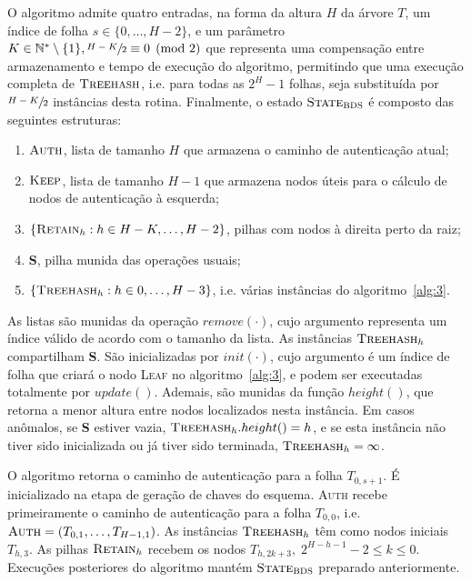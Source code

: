 \documentclass[12pt]{report}
\begin{document}
O algoritmo admite quatro entradas, na forma da altura $H$ da árvore $T$, um índice de folha $s \in \{0, \dots, H - 2\}$, e um parâmetro $K \in \mathbb{N}^{*} \setminus \{1\}, \sfrac{H - K}{2} \equiv 0 \pmod{2}$ que representa uma compensação entre armazenamento e tempo de execução do algoritmo, permitindo que uma execução completa de $\textsc{Treehash}$, i.e. para todas as $2^H - 1$ folhas, seja substituída por $\sfrac{H - K}{2}$ instâncias desta rotina. Finalmente, o estado $\textsc{State}_{\textsc{BDS}}$ é composto das seguintes estruturas: 

\begin{enumerate}[label=(\roman*)]

    \item $\textsc{Auth}$, lista de tamanho $H$ que armazena o caminho de autenticação atual;

    \item $\textsc{Keep}$, lista de tamanho $H - 1$ que armazena nodos úteis para o cálculo de nodos de autenticação à esquerda;
    
    \item $\{\textsc{Retain}_{h} : h \in H - K, \dots, H - 2\}$, pilhas com nodos à direita perto da raiz;
    
    \item \textbf{S}, pilha munida das operações usuais;
    
    \item $\{\textsc{Treehash}_{h} : h \in 0, \dots, H - 3\}$, i.e. várias instâncias do algoritmo~\ref{alg:3}.
\end{enumerate}

As listas são munidas da operação $remove(\cdot)$, cujo argumento representa um índice válido de acordo com o tamanho da lista. As instâncias $\textsc{Treehash}_{h}$ compartilham \textbf{S}. São inicializadas por $init(\cdot)$, cujo argumento é um índice de folha que criará o nodo \textsc{Leaf} no algoritmo~\ref{alg:3}, e podem ser executadas totalmente por $update()$. Ademais, são munidas da função $height()$, que retorna a menor altura entre nodos localizados nesta instância. Em casos anômalos, se \textbf{S} estiver vazia, $\textsc{Treehash}_{h}.height() = h$, e se esta instância não tiver sido inicializada ou já tiver sido terminada, $\textsc{Treehash}_{h} = \infty$.

O algoritmo retorna o caminho de autenticação para a folha $T_{0, s + 1}$. É inicializado na etapa de geração de chaves do esquema. \textsc{Auth} recebe primeiramente o caminho de autenticação para a folha $T_{0, 0}$, i.e. $\textsc{Auth} = (T_{0, 1}, \dots, T_{H -1, 1})$. As instâncias $\textsc{Treehash}_{h}$ têm como nodos iniciais $T_{h, 3}$. As pilhas $\textsc{Retain}_{h}$ recebem os nodos $T_{h, 2k + 3}, \; 2^{H - h - 1} - 2 \leq k \leq 0$. Execuções posteriores do algoritmo mantém $\textsc{State}_{\textsc{BDS}}$ preparado anteriormente.
\end{document}
